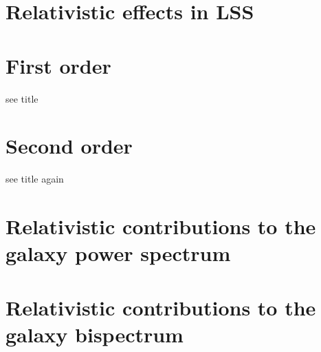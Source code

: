 \section{Relativistic effects in LSS}

\section{First order}

see title

\section{Second order}

see title again 

\section{Relativistic contributions to the galaxy power spectrum}

\section{Relativistic contributions to the galaxy bispectrum}